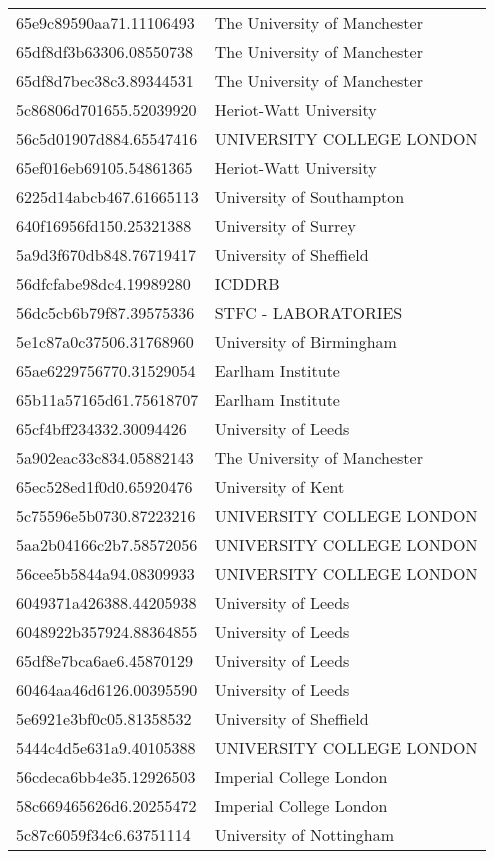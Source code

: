 \begin{tabular}{ll}
65e9c89590aa71.11106493 & The University of Manchester \\
65df8df3b63306.08550738 & The University of Manchester \\
65df8d7bec38c3.89344531 & The University of Manchester \\
5c86806d701655.52039920 & Heriot-Watt University \\
56c5d01907d884.65547416 & UNIVERSITY COLLEGE LONDON \\
65ef016eb69105.54861365 & Heriot-Watt University \\
6225d14abcb467.61665113 & University of Southampton \\
640f16956fd150.25321388 & University of Surrey \\
5a9d3f670db848.76719417 & University of Sheffield \\
56dfcfabe98dc4.19989280 & ICDDRB \\
56dc5cb6b79f87.39575336 & STFC - LABORATORIES \\
5e1c87a0c37506.31768960 & University of Birmingham \\
65ae6229756770.31529054 & Earlham Institute \\
65b11a57165d61.75618707 & Earlham Institute \\
65cf4bff234332.30094426 & University of Leeds \\
5a902eac33c834.05882143 & The University of Manchester \\
65ec528ed1f0d0.65920476 & University of Kent \\
5c75596e5b0730.87223216 & UNIVERSITY COLLEGE LONDON \\
5aa2b04166c2b7.58572056 & UNIVERSITY COLLEGE LONDON \\
56cee5b5844a94.08309933 & UNIVERSITY COLLEGE LONDON \\
6049371a426388.44205938 & University of Leeds \\
6048922b357924.88364855 & University of Leeds \\
65df8e7bca6ae6.45870129 & University of Leeds \\
60464aa46d6126.00395590 & University of Leeds \\
5e6921e3bf0c05.81358532 & University of Sheffield \\
5444c4d5e631a9.40105388 & UNIVERSITY COLLEGE LONDON \\
56cdeca6bb4e35.12926503 & Imperial College London \\
58c669465626d6.20255472 & Imperial College London \\
5c87c6059f34c6.63751114 & University of Nottingham \\

\end{tabular}
